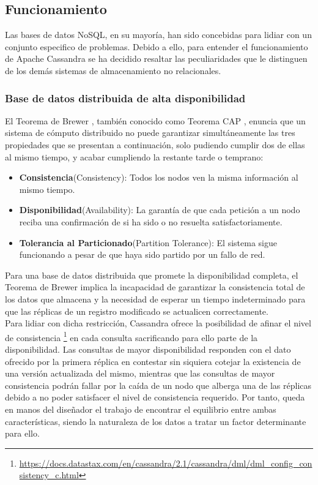 \subsection{Funcionamiento}

Las bases de datos NoSQL, en su mayoría, han sido concebidas para lidiar con un conjunto especifico de problemas. Debido a ello, para entender el funcionamiento de Apache Cassandra se ha decidido resaltar las peculiaridades que le distinguen de los demás sistemas de almacenamiento no relacionales.

\subsubsection{Base de datos distribuida de alta disponibilidad}

El Teorema de Brewer \cite{gilbert2002brewer}, también conocido como Teorema CAP , enuncia que un sistema de cómputo distribuido no puede  garantizar simultáneamente las tres propiedades que se presentan a continuación, solo pudiendo cumplir dos de ellas al mismo tiempo, y acabar cumpliendo la restante tarde o temprano:

\begin{itemize}
	\item \textbf{Consistencia}(Consistency): Todos los nodos ven la misma información al mismo tiempo.
	\item \textbf{Disponibilidad}(Availability): La garantía de que cada petición a un nodo reciba una confirmación de si ha sido o no resuelta satisfactoriamente.
	\item \textbf{Tolerancia al Particionado}(Partition Tolerance): El sistema sigue funcionando a pesar de que haya sido partido por un fallo de red.
\end{itemize}

Para una base de datos distribuida que promete la disponibilidad completa, el Teorema de Brewer implica la incapacidad de garantizar la consistencia total de los datos que almacena y la necesidad de esperar un tiempo indeterminado para que las réplicas de un registro modificado se actualicen correctamente.\\

Para lidiar con dicha restricción, Cassandra ofrece la posibilidad de afinar el nivel de consistencia \footnote{\url{https://docs.datastax.com/en/cassandra/2.1/cassandra/dml/dml_config_consistency_c.html}} en cada consulta sacrificando para ello parte de la disponibilidad. Las consultas de mayor disponibilidad responden con el dato ofrecido por la primera réplica en contestar sin siquiera cotejar la existencia de una versión actualizada del mismo, mientras que las consultas de mayor consistencia podrán fallar por la caída de un nodo que alberga una de las réplicas debido a no poder satisfacer el nivel de consistencia requerido. Por tanto, queda en manos del diseñador el trabajo de encontrar el equilibrio entre ambas características, siendo la naturaleza de los datos a tratar un factor determinante para ello.

